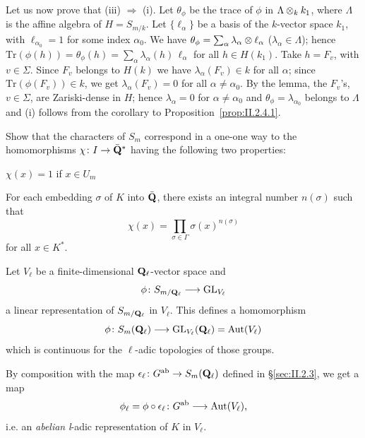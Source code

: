 Let us now prove that (iii) $\Rightarrow$ (i).  Let $\theta_\phi$ be the
trace of $\phi$ in $\Lambda \mathbin{\otimes}_k k_1$, where $\Lambda$ is the affine
algebra of $H = S_{m/k}$.  Let $\{\ell_\alpha\}$ be a basis of the
$k$-vector space $k_1$, with $\ell_{\alpha_0} = 1$ for some index
$\alpha_0$.  We have
$\theta_\phi = \sum_\alpha \lambda_\alpha \mathbin{\otimes} \ell_\alpha$
($\lambda_\alpha \in \Lambda$); hence
$\mathrm{Tr}(\phi(h)) = \theta_\phi(h) = \sum_\alpha
\lambda_\alpha(h)\,\ell_\alpha$ for all $h \in H(k_1)$.  Take
$h = F_v$, with $v \in \Sigma$.  Since $F_v$ belongs to $H(k)$ we have
$\lambda_\alpha(F_v) \in k$ for all $\alpha$; since
$\mathrm{Tr}(\phi(F_v)) \in k$, we get $\lambda_\alpha(F_v) = 0$ for all
$\alpha \neq \alpha_0$.  By the lemma, the $F_v$'s, $v \in \Sigma$, are
Zariski-dense in $H$; hence $\lambda_\alpha = 0$ for $\alpha \neq
\alpha_0$ and $\theta_\phi = \lambda_{\alpha_0}$ belongs to $\Lambda$
and (i) follows from the corollary to Proposition~\ref{prop:II.2.4.1}.


Show that the characters of $S_m$ correspond in a one-one way to the
homomorphisms $\chi\colon I \to \bar{\mathbf{Q}}^*$ having the following two
properties:
\begin{alist}
\item $\chi(x) = 1$ if $x \in U_m$
\item For each embedding $\sigma$ of $K$ into $\bar{\mathbf{Q}}$, there exists
an integral number $n(\sigma)$ such that
\[
\chi(x) = \prod_{\sigma \in \Gamma} \sigma(x)^{n(\sigma)}
\]
for all $x \in K^*$.
\end{alist}



Let $V_\ell$ be a finite-dimensional $\mathbf{Q}_\ell$-vector space and
\[
\phi\colon S_{m/\mathbf{Q}_\ell} \longrightarrow \mathrm{GL}_{V_\ell}
\]
a linear representation of $S_{m/\mathbf{Q}_\ell}$ in $V_\ell$.  This defines a
homomorphism
\[
\phi\colon S_m(\mathbf{Q}_\ell) \longrightarrow \mathrm{GL}_{V_\ell}(\mathbf{Q}_\ell)
= \mathrm{Aut}(V_\ell)
\]
which is continuous for the $\ell$-adic topologies of those groups.

By composition with the map
$\epsilon_\ell\colon G^{\mathrm{ab}} \to S_m(\mathbf{Q}_\ell)$ defined in
\S\ref{sec:II.2.3}, we get a map
\[
\phi_\ell = \phi \circ \epsilon_\ell\colon G^{\mathrm{ab}}
\longrightarrow \mathrm{Aut}(V_\ell),
\]
i.e.  an \emph{abelian} \textit{l}-adic representation of $K$ in
$V_\ell$.

